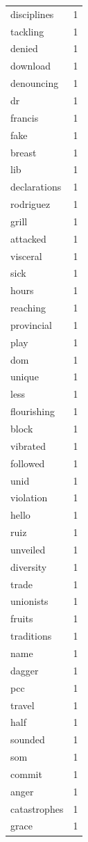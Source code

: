 \begin{tabular}{lr}
disciplines & 1 \\
tackling & 1 \\
denied & 1 \\
download & 1 \\
denouncing & 1 \\
dr & 1 \\
francis & 1 \\
fake & 1 \\
breast & 1 \\
lib & 1 \\
declarations & 1 \\
rodriguez & 1 \\
grill & 1 \\
attacked & 1 \\
visceral & 1 \\
sick & 1 \\
hours & 1 \\
reaching & 1 \\
provincial & 1 \\
play & 1 \\
dom & 1 \\
unique & 1 \\
less & 1 \\
flourishing & 1 \\
block & 1 \\
vibrated & 1 \\
followed & 1 \\
unid & 1 \\
violation & 1 \\
hello & 1 \\
ruiz & 1 \\
unveiled & 1 \\
diversity & 1 \\
trade & 1 \\
unionists & 1 \\
fruits & 1 \\
traditions & 1 \\
name & 1 \\
dagger & 1 \\
pcc & 1 \\
travel & 1 \\
half & 1 \\
sounded & 1 \\
som & 1 \\
commit & 1 \\
anger & 1 \\
catastrophes & 1 \\
grace & 1 \\

\end{tabular}
